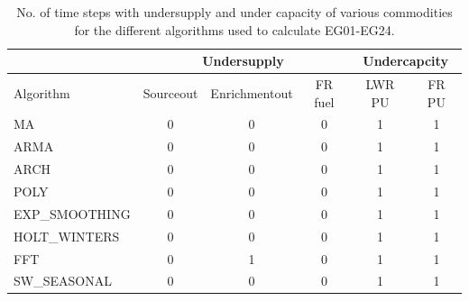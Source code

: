 \documentclass[11pt,letterpaper]{article}
\begin{document}
\begin{table}[]
	\centering
	\caption {No. of time steps with undersupply and under capacity of various commodities for the different algorithms used to calculate EG01-EG24.}
	\label{tab:24-commod}
	\begin{tabular}{|l|c|c|c|c|c|}
		\hline
		& \multicolumn{3}{c|}{Undersupply} & \multicolumn{2}{c|}{Undercapcity} \\ \hline
		Algorithm & Sourceout & Enrichmentout & FR fuel & LWR PU & FR PU \\ \hline
		MA        & 0 & 0 & 0 & 1 & 1 \\ \hline
		ARMA      & 0 & 0 & 0 & 1 & 1 \\ \hline
		ARCH      & 0 & 0 & 0 & 1 & 1 \\ \hline
		POLY      & 0 & 0 & 0 & 1 & 1 \\ \hline
		EXP\_SMOOTHING & 0 & 0 & 0 & 1 & 1 \\ \hline
		HOLT\_WINTERS  & 0 & 0 & 0 & 1 & 1 \\ \hline
		FFT       & 0 & 1 & 0 & 1 & 1 \\ \hline
		SW\_SEASONAL  & 0 & 0 & 0 & 1 & 1 \\ \hline
	\end{tabular}
\end{table}
\end{document}
